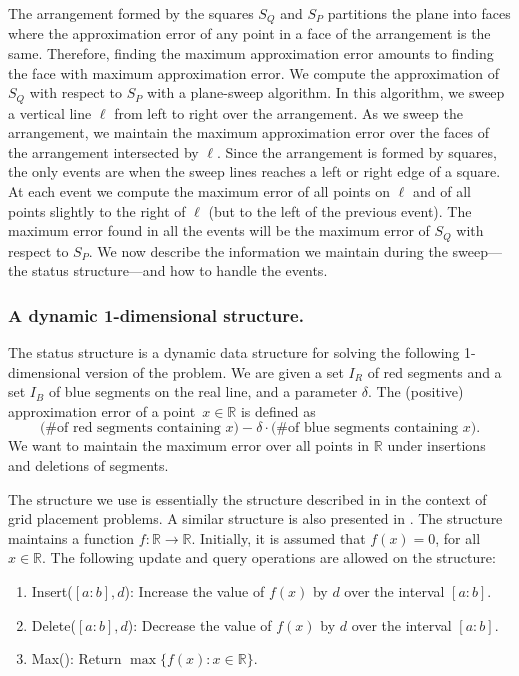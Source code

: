 \documentclass{elsart}
\newcommand{\Reals}{{\mathbb{R}}}            %
\begin{document}
The arrangement formed by the squares $S_Q$ and $S_P$ partitions the
plane into faces where the approximation error of any point in a face
of the arrangement is the same. Therefore, finding the maximum
approximation error amounts to finding the face with maximum
approximation error. We compute the approximation of $S_Q$ with
respect to $S_P$ with a plane-sweep algorithm. In this algorithm, we
sweep a vertical line $\ell$ from left to right over the
arrangement. As we sweep the arrangement, we maintain the maximum
approximation error over the faces of the arrangement intersected by
$\ell$. Since the arrangement is formed by squares, the only events
are when the sweep lines reaches a left or right edge of a square. At
each event we compute the maximum error of all points on $\ell$ and of
all points slightly to the right of $\ell$ (but to the left of the
previous event). The maximum error found in all the events will be the
maximum error of $S_Q$ with respect to $S_P$.
We now describe the
information we maintain during the sweep---the status structure---and
how to handle the events.

\subsubsection{A dynamic 1-dimensional structure.}
The status structure is a dynamic data structure for solving the
following 1-dimensional version of the problem. We are given a set
$I_R$ of red segments and a set $I_B$ of blue segments on the real line,
and a parameter $\delta$. The (positive) approximation error
of a point~$x\in \Reals$ is defined as
\[
\mbox{(\# of red segments containing~$x$)} -
\delta \cdot \mbox{(\# of blue segments containing~$x$)}.
\]
We want to maintain the maximum error over
all points in $\Reals$  under insertions and deletions of segments.

The structure we use is essentially the structure described in
\cite{bkmmm-trgps-01} in the context of grid placement problems.
A similar structure is also presented in \cite{dgm96}. 
The structure maintains a function $f:\Reals \to \Reals$. Initially, it is
assumed that $f(x) = 0$, for all $x \in \Reals$. The following update
and query operations are allowed on the structure:

\begin{enumerate}
\item Insert($[a:b], d$): Increase the value of $f(x)$ by $d$ over the interval
$[a:b]$.
\item Delete($[a:b], d$): Decrease the value of $f(x)$ by $d$ over the interval
$[a:b]$.
\item Max(): Return $\max\{f(x):x \in \Reals\}$.
\end{enumerate}
\end{document}
